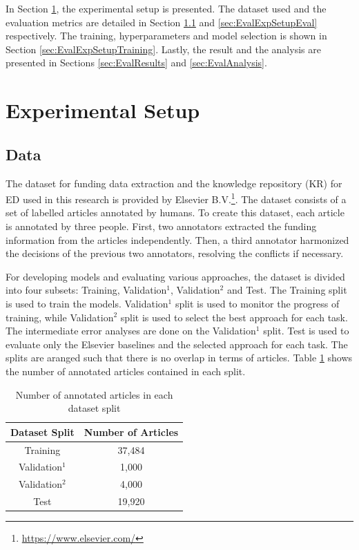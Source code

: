 \documentclass{report}
\theoremstyle{definition}
\theoremstyle{remark}
\begin{document}
In Section \ref{sec:EvalExpSetup}, the experimental setup is presented. The dataset used and the evaluation metrics are detailed in Section \ref{sec:EvalExpSetupData} and \ref{sec:EvalExpSetupEval} respectively. The training, hyperparameters and model selection is shown in Section \ref{sec:EvalExpSetupTraining}. Lastly, the result and the analysis are presented in Sections \ref{sec:EvalResults} and \ref{sec:EvalAnalysis}.

\section{Experimental Setup}
\label{sec:EvalExpSetup}

\subsection{Data}
\label{sec:EvalExpSetupData}

The dataset for funding data extraction and the knowledge repository (KR) for ED used in this research is provided by Elsevier B.V.\footnote{\url{https://www.elsevier.com/}}. The dataset consists of a set of labelled articles annotated by humans. To create this dataset, each article is annotated by three people. First, two annotators extracted the funding information from the articles independently. Then, a third annotator harmonized the decisions of the previous two annotators, resolving the conflicts if necessary. 

For developing models and evaluating various approaches, the dataset is divided into four subsets: Training, Validation$^{1}$, Validation$^{2}$ and Test. The Training split is used to train the models. Validation$^{1}$ split is used to monitor the progress of training, while Validation$^{2}$ split is used to select the best approach for each task. The intermediate error analyses are done on the Validation$^{1}$ split. Test is used to evaluate only the Elsevier baselines and the selected approach for each task. The splits are aranged such that there is no overlap in terms of articles. Table \ref{tab:goldstats} shows the number of annotated articles contained in each split.

\begin{table}[h!]
    \centering
    \begin{tabular}{c c}
    Dataset Split  & Number of Articles  \\
        \hline
    Training &  37,484\\
    Validation$^1$ & 1,000\\
    Validation$^2$ & 4,000\\
    Test & 19,920 \\
    \end{tabular}
    \caption{Number of annotated articles in each dataset split}
    \label{tab:goldstats}
\end{table}
\end{document}

